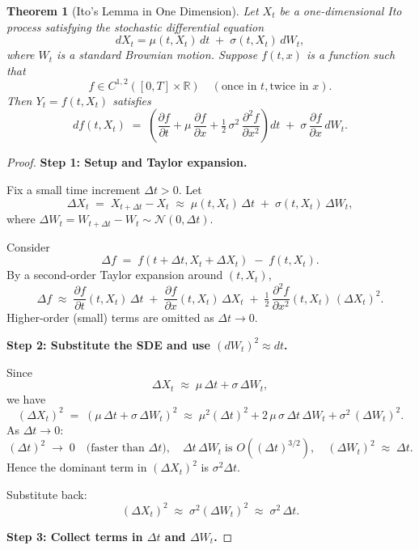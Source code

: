 \documentclass[a4paper,11pt]{book}
\newtheorem{theorem}{Theorem}[section]
\theoremstyle{definition}
\theoremstyle{remark}
\begin{document}
\begin{theorem}[Ito's Lemma in One Dimension]
\label{thm:Ito}
Let $X_t$ be a one-dimensional Ito process satisfying the stochastic differential equation
\[
   dX_t = \mu(t, X_t)\,dt \;+\; \sigma(t, X_t)\, dW_t,
\]
where $W_t$ is a standard Brownian motion. Suppose $f(t, x)$ is a function such that
\[
   f \in C^{1,2}([0,T] \times \mathbb{R}) 
   \quad(\text{once in } t, \text{twice in } x).
\]
Then $Y_t = f(t, X_t)$ satisfies
\[
   df(t, X_t)
   \;=\;
   \left(
     \frac{\partial f}{\partial t} 
     + \mu \,\frac{\partial f}{\partial x} 
     + \tfrac{1}{2}\,\sigma^2 \,\frac{\partial^2 f}{\partial x^2}
   \right)\!dt
   \;+\;
   \sigma \,\frac{\partial f}{\partial x}\,dW_t.
\]
\end{theorem}

\begin{proof}
\textbf{Step 1: Setup and Taylor expansion.}

Fix a small time increment $\Delta t > 0$. Let
\[
   \Delta X_t \;=\; X_{t+\Delta t} - X_t 
   \;\approx\; \mu(t, X_t)\,\Delta t \;+\; \sigma(t, X_t)\,\Delta W_t,
\]
where $\Delta W_t = W_{t+\Delta t} - W_t \sim \mathcal{N}(0,\Delta t)$.

Consider 
\[
   \Delta f \;=\; f(t + \Delta t, X_t + \Delta X_t) \;-\; f(t, X_t).
\]
By a second-order Taylor expansion around $(t, X_t)$,
\[
   \Delta f 
   \;\approx\;
   \frac{\partial f}{\partial t}(t,X_t)\,\Delta t
   \;+\;
   \frac{\partial f}{\partial x}(t,X_t)\,\Delta X_t
   \;+\;
   \tfrac{1}{2}\,\frac{\partial^2 f}{\partial x^2}(t,X_t)\,(\Delta X_t)^2.
\]
Higher-order (small) terms are omitted as $\Delta t \to 0$.

\medskip
\textbf{Step 2: Substitute the SDE and use $(dW_t)^2 \approx dt$.}

Since
\[
   \Delta X_t 
   \;\approx\;
   \mu\,\Delta t + \sigma\,\Delta W_t,
\]
we have
\[
   (\Delta X_t)^2
   \;=\;
   (\mu\,\Delta t + \sigma\,\Delta W_t)^2
   \;\approx\;
   \mu^2 (\Delta t)^2 + 2\,\mu\,\sigma\,\Delta t\,\Delta W_t + \sigma^2\,(\Delta W_t)^2.
\]
As $\Delta t \to 0$:
\[
   (\Delta t)^2 \;\to\; 0 
   \quad\text{(faster than } \Delta t\text{)},
   \quad
   \Delta t \,\Delta W_t \;\text{is } O((\Delta t)^{3/2}),
   \quad
   (\Delta W_t)^2 \;\approx\; \Delta t.
\]
Hence the dominant term in $(\Delta X_t)^2$ is $\sigma^2 \Delta t$.

Substitute back:
\[
   (\Delta X_t)^2 \;\approx\; \sigma^2 (\Delta W_t)^2 \;\approx\; \sigma^2 \,\Delta t.
\]

\medskip
\textbf{Step 3: Collect terms in $\Delta t$ and $\Delta W_t$.}


\end{proof}
\end{document}
